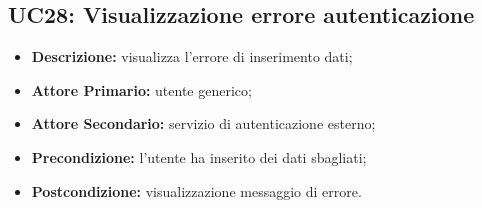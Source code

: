 \subsection{UC28: Visualizzazione errore autenticazione }
\label{sec:UC28}
\begin{itemize}
    \item \textbf{Descrizione:} visualizza l'errore di inserimento dati;
    \item \textbf{Attore Primario:} utente generico;
    \item \textbf{Attore Secondario:} servizio di autenticazione esterno;
    \item \textbf{Precondizione:} l'utente ha inserito dei dati sbagliati;
    \item \textbf{Postcondizione:} visualizzazione messaggio di errore.
\end{itemize}